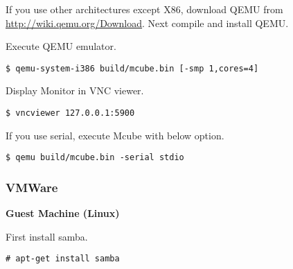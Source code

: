 If you use other architectures except X86, download QEMU from
\url{http://wiki.qemu.org/Download}.
Next compile and install QEMU.


Execute QEMU emulator.

\noindent
\begin{Sbox}
\begin{minipage}[t]{0.975\linewidth}
\begin{verbatim}
$ qemu-system-i386 build/mcube.bin [-smp 1,cores=4]
\end{verbatim}
\end{minipage}
\end{Sbox}
\fbox{\TheSbox}

Display Monitor in VNC viewer.

\noindent
\begin{Sbox}
\begin{minipage}[t]{0.975\linewidth}
\begin{verbatim}
$ vncviewer 127.0.0.1:5900
\end{verbatim}
\end{minipage}
\end{Sbox}
\fbox{\TheSbox}


If you use serial, execute Mcube with below option.

\noindent
\begin{Sbox}
\begin{minipage}[t]{0.975\linewidth}
\begin{verbatim}
$ qemu build/mcube.bin -serial stdio
\end{verbatim}
\end{minipage}
\end{Sbox}
\fbox{\TheSbox}



\subsubsection*{VMWare}


\textbf{Guest Machine (Linux)}

First install samba.

\noindent
\begin{Sbox}
\begin{minipage}[t]{0.975\linewidth}
\begin{verbatim}
# apt-get install samba
\end{verbatim}
\end{minipage}
\end{Sbox}
\fbox{\TheSbox}

